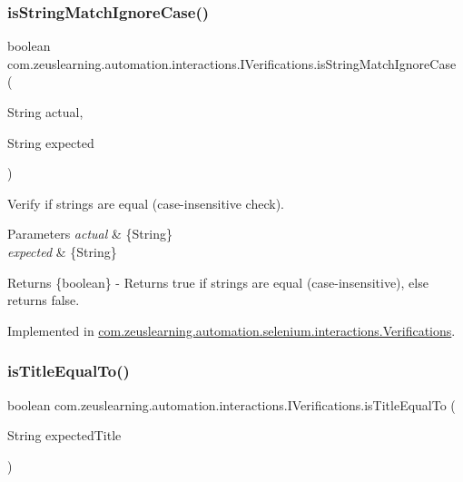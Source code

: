 \subsubsection{\texorpdfstring{is\+String\+Match\+Ignore\+Case()}{isStringMatchIgnoreCase()}}
{\footnotesize\ttfamily boolean com.\+zeuslearning.\+automation.\+interactions.\+I\+Verifications.\+is\+String\+Match\+Ignore\+Case (\begin{DoxyParamCaption}\item[{String}]{actual,  }\item[{String}]{expected }\end{DoxyParamCaption})}

Verify if strings are equal (case-\/insensitive check).


\begin{DoxyParams}{Parameters}
{\em actual} & \{String\} \\
\hline
{\em expected} & \{String\} \\
\hline
\end{DoxyParams}
\begin{DoxyReturn}{Returns}
\{boolean\} -\/ Returns {\ttfamily true} if strings are equal (case-\/insensitive), else returns {\ttfamily false}. 
\end{DoxyReturn}


Implemented in \hyperlink{classcom_1_1zeuslearning_1_1automation_1_1selenium_1_1interactions_1_1Verifications_af7b6b23977e6ef4e53a2a4f0d606e26e}{com.\+zeuslearning.\+automation.\+selenium.\+interactions.\+Verifications}.

\hypertarget{interfacecom_1_1zeuslearning_1_1automation_1_1interactions_1_1IVerifications_a5174c7c27f09f3833d34dafc34b92ac8}{}\label{interfacecom_1_1zeuslearning_1_1automation_1_1interactions_1_1IVerifications_a5174c7c27f09f3833d34dafc34b92ac8} 
\subsubsection{\texorpdfstring{is\+Title\+Equal\+To()}{isTitleEqualTo()}}
{\footnotesize\ttfamily boolean com.\+zeuslearning.\+automation.\+interactions.\+I\+Verifications.\+is\+Title\+Equal\+To (\begin{DoxyParamCaption}\item[{String}]{expected\+Title }\end{DoxyParamCaption})}

